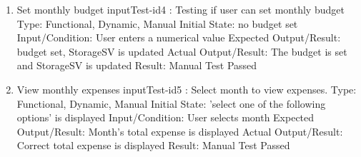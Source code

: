\documentclass[12pt, titlepage]{article}
\begin{document}
\begin{enumerate}
\item{Set monthly budget}\label{I4}
inputTest-id4 : Testing if user can set monthly budget
\newline
Type: Functional, Dynamic, Manual
\newline
Initial State: no budget set
\newline
Input/Condition: User enters a numerical value
\newline
Expected Output/Result: budget set, StorageSV is updated
\newline
Actual Output/Result: The budget is set and StorageSV is updated
\newline
Result: Manual Test Passed

\item{View monthly expenses}\label{I5}
inputTest-id5 : Select month to view expenses.
\newline
Type: Functional, Dynamic, Manual 
\newline
Initial State: 'select one of the following options' is displayed 
\newline
Input/Condition: User selects month
\newline
Expected Output/Result: Month's total expense is displayed
\newline
Actual Output/Result: Correct total expense is displayed
\newline
Result: Manual Test Passed
\end{enumerate}
\end{document}
